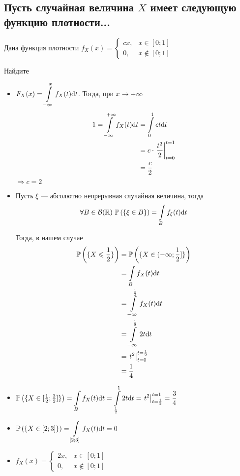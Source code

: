 \documentclass{article}
\begin{document}
\subsection{Пусть случайная величина $X$ имеет следующую функцию плотности...}
Дана функция плотности $f_{X}(x)=\begin{cases}
    cx,&x\in[0;1]\\
    0,&x\not\in[0;1]
\end{cases}$

Найдите
\begin{itemize}
    \item $F_X(x)=\displaystyle\int\limits_{-\infty}^{x} f_X(t)\text{d}t$. Тогда, при $x\to+\infty$
    \begin{equation*}
        \begin{aligned}
            1=\int\limits_{-\infty}^{+\infty} f_X(t)\text{d}t&=\int\limits_0^1 ct\text{d}t\\
            &=c\cdot\left.\frac{t^2}{2}\right\vert_{t=0}^{t=1}\\
            &=\frac{c}{2}
        \end{aligned}
    \end{equation*}
    $\Longrightarrow c=2$
    \item \theorem Пусть $\xi$ — абсолютно непрерывная случайная величина, тогда $$\forall B\in\mathcal{B}(\mathbb{R})\ \mathbb{P}\left(\{\xi\in B\}\right)=\displaystyle\int\limits_{B}f_{\xi}(t)\text{d}t$$
    
    Тогда, в нашем случае
    \begin{equation*}
        \begin{aligned}
            \mathbb{P}\left(\{X\leqslant\frac{1}{2}\}\right)&=\mathbb{P}\left(\{X\in(-\infty;\frac{1}{2}]\}\right)\\
            &=\int\limits_{B}f_{X}(t)\text{d}t\\
            &=\int\limits_{-\infty}^{\frac{1}{2}}f_{X}(t)\text{d}t\\
            &=\int\limits_{-\infty}^{\frac{1}{2}}2t\text{d}t\\
            &=\left.t^2\right\vert_{t=0}^{t=\frac{1}{2}}\\
            &=\frac{1}{4}
        \end{aligned}
    \end{equation*}
    \item $\mathbb{P}\left(\{X\in[\frac{1}{2};\frac{3}{2}]\}\right)=\displaystyle\int\limits_{B}f_{X}(t)\text{d}t=\int\limits_{\frac{1}{2}}^{1}2t\text{d}t=\left.t^2\right\vert_{t=\frac{1}{2}}^{t=1}=\frac{3}{4}$
    \item $\mathbb{P}\left(\{X\in[2;3]\}\right)=\displaystyle\int\limits_{[2;3]}f_{X}(t)\text{d}t=0$
    \item $f_{X}(x)=\begin{cases}
        2x,&x\in[0;1]\\
        0,&x\not\in[0;1]
    \end{cases}$


\end{itemize}
\end{document}
